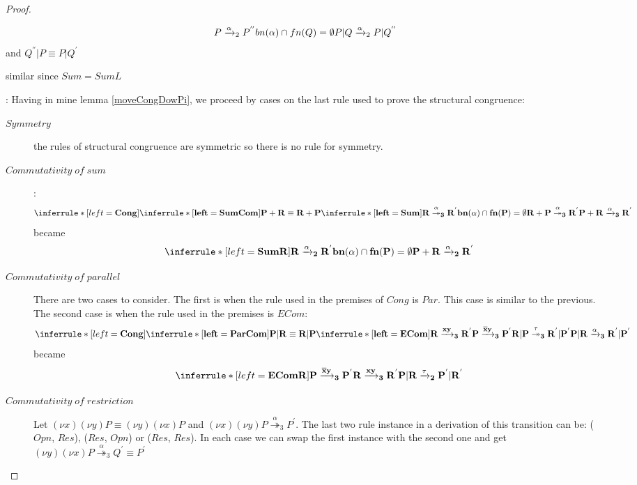 \begin{theorem}
\begin{proof}
\begin{description}
\[{			  P\xrightarrow{\alpha}_{2}P^{''}
			\\
			  bn(\alpha)\cap fn(Q)=\emptyset
		      }{
			  P|Q\xrightarrow{\alpha}_{2}P|Q^{''}
		      }
		\]
		and $Q^{''}|P\equiv P|Q^{'}$
      \item[$Sum$] similar since $Sum=SumL$
      \item[$Cong$]:
	Having in mine lemma \ref{moveCongDowPi}, we proceed by cases on the last rule used to prove the structural congruence:
	\begin{description}
	  \item[$Symmetry$] 
	    the rules of structural congruence are symmetric so there is no rule for symmetry.
	  \item[$Commutativity\; of\; sum$]:
	    \[\inferrule* [left=\bf{Cong}]{
		\inferrule* [left=\bf{SumCom}]{
		}{
		  P + R \equiv R + P
		}
	      \\
		\inferrule* [left=\bf{Sum}]{
		    R \stackrel{\alpha}{\twoheadrightarrow}_{3} R^{'}
		  \\
		    bn(\alpha) \cap fn(P) = \emptyset
		}{
		  R + P \stackrel{\alpha}{\twoheadrightarrow}_{3} R^{'}
		}
	    }{
	      P + R \xrightarrow{\alpha}_{3} R^{'}
	    }\]
	    became
	    \[\inferrule* [left=\bf{SumR}]{
		    R \xrightarrow{\alpha}_{2} R^{'}
		  \\
		    bn(\alpha) \cap fn(P) = \emptyset
		}{
		  P + R \xrightarrow{\alpha}_{2} R^{'}
	    }\]
	  \item[$Commutativity\; of\; parallel$]
	    There are two cases to consider. The first is when the rule used in the premises of $Cong$ is $Par$. This case is similar to the previous. The second case is when the rule used in the premises is $ECom$:
	    \[\inferrule* [left=\bf{Cong}]{
		\inferrule* [left=\bf{ParCom}]{
		}{
		  P | R \equiv R | P
		}
	      \\
		\inferrule* [left=\bf{ECom}]{
		    R \xrightarrow{xy}_{3} R^{'}
		  \\
		    P \xrightarrow{\overline{x}y}_{3} P^{'}
		}{
		  R|P \stackrel{\tau}{\twoheadrightarrow}_{3} R^{'}|P^{'}
		}
	    }{
	      P|R \xrightarrow{\alpha}_{3} R^{'}|P^{'}
	    }\]
	    became
	    \[\inferrule* [left=\bf{EComR}]{
		    P \xrightarrow{\overline{x}y}_{3} P^{'}
		  \\
		    R \xrightarrow{xy}_{3} R^{'}
		}{
		  P|R \xrightarrow{\tau}_{2} P^{'}|R^{'}
	    }\]
	  \item[$Commutativity\; of\; restriction$]
	    Let $(\nu x)(\nu y)P \equiv (\nu y)(\nu x)P$ and $(\nu x)(\nu y)P \stackrel{\alpha}{\twoheadrightarrow}_{3} P^{'}$. The last two rule instance in a derivation of this transition can be: ($Opn$, $Res$), ($Res$, $Opn$) or ($Res$, $Res$). In each case we can swap the first instance with the second one and get $(\nu y)(\nu x)P \stackrel{\alpha}{\twoheadrightarrow}_{3} Q^{'}\equiv P^{'}$

\end{description}
\end{description}
\end{proof}
\end{theorem}
